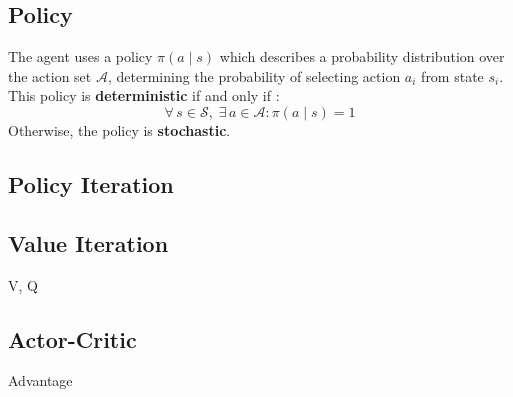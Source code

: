 \subsection{Policy}
The agent uses a policy $\pi(a \mid s)$ which describes a probability
distribution over the action set $\mathcal{A}$, determining the probability of
selecting action $a_i$ from state $s_i$. This policy is 
\textbf{deterministic} if and only if :
$$ \forall\, s \in \mathcal{S},\; \exists\, a \in \mathcal{A} : \pi(a \mid s) = 1 $$ 
\noindent Otherwise, the policy is \textbf{stochastic}.


\subsection{Policy Iteration}

\subsection{Value Iteration}
V, Q

\subsection{Actor-Critic}


Advantage

